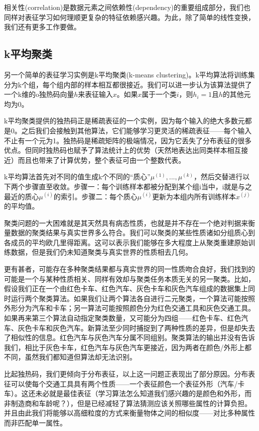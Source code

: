 相关性(correlation)是数据元素之间依赖性(dependency)的重要组成部分，我们也同样对表征学习如何理顺更复杂的特征依赖感兴趣。为此，除了简单的线性变换，我们还有更多工作要做。

\subsection{k平均聚类}
\label{sec:5.8.2}

另一个简单的表征学习实例是k平均聚类(k-means clustering)。k平均算法将训练集分为k个组，每个组内部的样本相互都很接近。我们可以进一步认为该算法提供了一个k维的o独热码向量$h$来表征输入$x$。如果$x$属于一个类$i$，则$h_i=1$且$h$的其他元均为0。

k平均聚类提供的独热码正是稀疏表征的一个实例，因为每个输入的绝大多数元都是0。之后我们会接触到其他算法，它们能够学习更灵活的稀疏表征——每个输入不止有一个元为1。独热码是稀疏矩阵的极端情况，因为它丢失了分布表征的很多优点。但同时独热码也赋予了算法统计上的优势（天然地表达出同类样本相互接近）而且也带来了计算优势，整个表征可由一个整数代表。

k平均算法首先对不同的值生成k个不同的“质心”${\mu^{(1)},...,\mu^{(k)}}$，然后交替进行以下两个步骤直至收敛。步骤一：每个训练样本都被分配到某个组i当中，i就是与之最近的质心$\mu^{(i)}$的索引。步骤二：每个质心$\mu^{(i)}$更新为本组内所有训练样本$x^{(j)}$的平均值。

聚类问题的一大困难就是其天然具有病态性质，也就是并不存在一个绝对判据来衡量数据的聚类结果与真实世界多么符合。我们可以聚类的某些性质诸如分组质心到各成员的平均欧几里得距离。这可以表示我们能够在多大程度上从聚类重建原始训练数据，但是我们仍未知道聚类与真实世界的性质相去几何。

更有甚者，可能存在多种聚类结果都与真实世界的同一性质吻合良好，我们找到的可能是一个与某种性质相关、同样有效却与聚类任务本质无关的另一聚类。比如，假设我们正在一个由红色卡车、红色汽车、灰色卡车和灰色汽车组成的数据集上同时运行两个聚类算法。如果我们让两个算法各自进行二元聚类，一个算法可能按照外形分为汽车和卡车；另一算法可能按照颜色分为红色交通工具和灰色交通工具。如果再来第三个算法自动指定聚类数量，又可能分为四组——红色卡车、红色汽车、灰色卡车和灰色汽车。新算法至少同时捕捉到了两种性质的差异，但是却失去了相似性的信息。红色汽车与灰色汽车分属不同组别。聚类算法的输出并没有告诉我们，相比于灰色卡车，红色汽车与灰色汽车更接近，因为两者在颜色/外形上都不同，虽然我们都知道但算法却无法识别。

比起独热码，我们更倾向于分布表征，以上这一问题正表现出了部分原因。分布表征可以使每个交通工具具有两个性质——一个表征颜色一个表征外形（汽车/卡车）。这还未必就是最佳表征（学习算法怎么知道我们感兴趣的是颜色和外形，而非制造商和车龄呢？），但是已经减轻了算法猜测应该关照哪些属性的计算负担。并且由此我们将能够以高细粒度的方式来衡量物体之间的相似度——对比多种属性而非匹配单一属性。

